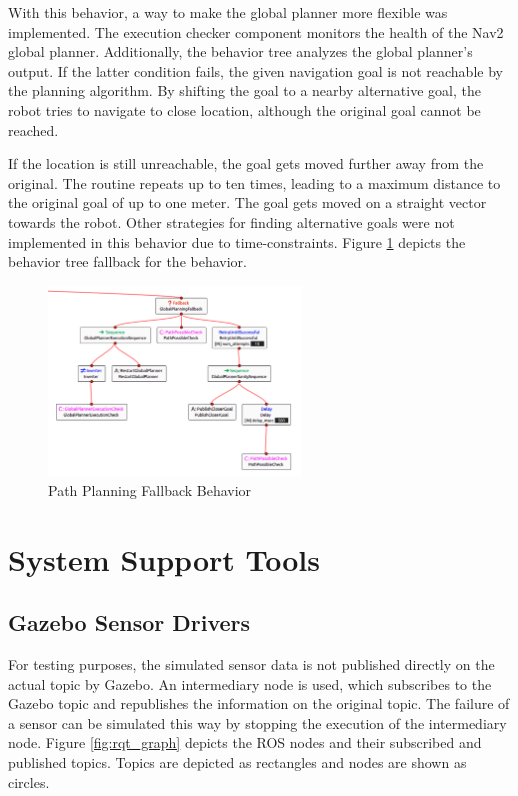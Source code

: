 With this behavior, a way to make the global planner more flexible was implemented. The execution checker component monitors the health of the Nav2 global planner. Additionally, the behavior tree analyzes the global planner's output. If the latter condition fails, the given navigation goal is not reachable by the planning algorithm. By shifting the goal to a nearby alternative goal, the robot tries to navigate to close location, although the original goal cannot be reached. 

If the location is still unreachable, the goal gets moved further away from the original. The routine repeats up to ten times, leading to a maximum distance to the original goal of up to one meter. The goal gets moved on a straight vector towards the robot. Other strategies for finding alternative goals were not implemented in this behavior due to time-constraints. Figure \ref{fig:global_planning_fallback} depicts the behavior tree fallback for the behavior.

\begin{figure}[ht]
	\centering
	\includegraphics[width=0.6\textwidth]{images/global_planning_fallback_inverted.png}
	\caption{Path Planning Fallback Behavior}
	\label{fig:global_planning_fallback}
\end{figure}

\section{System Support Tools}
\subsection{Gazebo Sensor Drivers}
\label{subsec:gazebo_driver}

For testing purposes, the simulated sensor data is not published directly on the actual topic by Gazebo. An intermediary node is used, which subscribes to the Gazebo topic and republishes the information on the original topic. The failure of a sensor can be simulated this way by stopping the execution of the intermediary node. Figure \ref{fig:rqt_graph} depicts the ROS nodes and their subscribed and published topics. Topics are depicted as rectangles and nodes are shown as circles. 

